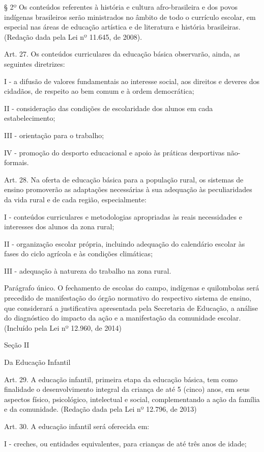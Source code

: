 \documentclass[
]{book}
\begin{document}
§ 2º Os conteúdos referentes à história e cultura afro-brasileira e dos povos indígenas brasileiros serão ministrados no âmbito de todo o currículo escolar, em especial nas áreas de educação artística e de literatura e história brasileiras. (Redação dada pela Lei nº 11.645, de 2008).

Art. 27. Os conteúdos curriculares da educação básica observarão, ainda, as seguintes diretrizes:

I - a difusão de valores fundamentais ao interesse social, aos direitos e deveres dos cidadãos, de respeito ao bem comum e à ordem democrática;

II - consideração das condições de escolaridade dos alunos em cada estabelecimento;

III - orientação para o trabalho;

IV - promoção do desporto educacional e apoio às práticas desportivas não-formais.

Art. 28. Na oferta de educação básica para a população rural, os sistemas de ensino promoverão as adaptações necessárias à sua adequação às peculiaridades da vida rural e de cada região, especialmente:

I - conteúdos curriculares e metodologias apropriadas às reais necessidades e interesses dos alunos da zona rural;

II - organização escolar própria, incluindo adequação do calendário escolar às fases do ciclo agrícola e às condições climáticas;

III - adequação à natureza do trabalho na zona rural.

Parágrafo único. O fechamento de escolas do campo, indígenas e quilombolas será precedido de manifestação do órgão normativo do respectivo sistema de ensino, que considerará a justificativa apresentada pela Secretaria de Educação, a análise do diagnóstico do impacto da ação e a manifestação da comunidade escolar. (Incluído pela Lei nº 12.960, de 2014)

Seção II

Da Educação Infantil

Art. 29. A educação infantil, primeira etapa da educação básica, tem como finalidade o desenvolvimento integral da criança de até 5 (cinco) anos, em seus aspectos físico, psicológico, intelectual e social, complementando a ação da família e da comunidade. (Redação dada pela Lei nº 12.796, de 2013)

Art. 30. A educação infantil será oferecida em:

I - creches, ou entidades equivalentes, para crianças de até três anos de idade;
\end{document}
